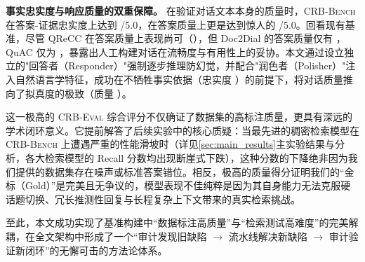 \textbf{事实忠实度与响应质量的双重保障。} 在验证对话文本本身的质量时，\textsc{CRB-Bench} 在答案-证据忠实度上达到 /5.0，在答案质量上更是达到惊人的 /5.0。回看现有基准，尽管 QReCC 在答案质量上表现尚可（\TBD{}），但 Doc2Dial 的答案质量仅有 \TBD{}，QuAC 仅为 \TBD{}，暴露出人工构建对话在流畅度与有用性上的妥协。本文通过设立独立的"回答者（Responder）"强制逐步推理防幻觉，并配合"润色者（Polisher）"注入自然语言学特征，成功在不牺牲事实依据（忠实度 \TBD{}）的前提下，将对话质量推向了拟真度的极致（质量 \TBD{}）。

这一极高的 \textsc{CRB-Eval} 综合评分不仅确证了数据集的高标注质量，更具有深远的学术闭环意义。它提前解答了后续实验中的核心质疑：当最先进的稠密检索模型在 \textsc{CRB-Bench} 上遭遇严重的性能滑坡时（详见\ref{sec:main_results}主实验结果与分析，各大检索模型的 Recall 分数均出现断崖式下跌），这种分数的下降绝非因为我们提供的数据集存在噪声或标准答案错位。相反，极高的质量得分证明我们的“金标（Gold）”是完美且无争议的，模型表现不佳纯粹是因为其自身能力无法克服硬话题切换、冗长推测性回复与长程复杂上下文带来的真实检索挑战。

至此，本文成功实现了基准构建中“数据标注高质量”与“检索测试高难度”的完美解耦，在全文架构中形成了一个“审计发现旧缺陷 $\rightarrow$ 流水线解决新缺陷 $\rightarrow$ 审计验证新闭环”的无懈可击的方法论体系。
















